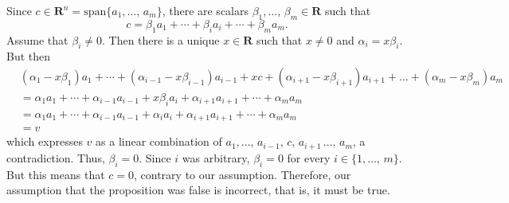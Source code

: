 \documentclass[a4paper,11pt]{article}
\newcommand{\R}{\mathbf{R}}
\begin{document}
Since $c \in \R^n=\text{span}\{a_1,\dots,\,a_m\}$, there are scalars
$\beta_1,\dots,\,\beta_m \in \R$ such that
\[
  c = \beta_1a_1 + \cdots + \beta_ia_i + \cdots + \beta_ma_m.
\]
Assume that $\beta_i \neq 0$. Then there is a unique $x \in \R$ such that $x
\neq 0$ and $\alpha_i = x\beta_i$. But then
\begin{align*}
  &(\alpha_1-x\beta_1)a_1 + \cdots + (\alpha_{i-1}-x\beta_{i-1})a_{i-1} +
  xc + (\alpha_{i+1}-x\beta_{i+1})a_{i+1} + \dots + (\alpha_m-x\beta_m)a_m \\
  &= \alpha_1a_1 + \cdots + \alpha_{i-1}a_{i-1} + x\beta_ia_i +
    \alpha_{i+1}a_{i+1} + \cdots + \alpha_ma_m \\
  &= \alpha_1a_1 + \cdots + \alpha_{i-1}a_{i-1} + \alpha_ia_i +
    \alpha_{i+1}a_{i+1} + \cdots + \alpha_ma_m \\
  &= v
\end{align*}
which expresses $v$ as a linear combination of
$a_1,\dots,\,a_{i-1},\,c,\,a_{i+1}\,\dots,\,a_m$, a contradiction. Thus,
$\beta_i = 0$. Since $i$ was arbitrary, $\beta_i = 0$ for every $i \in
\{1,\dots,\,m\}$. But this means that $c=0$, contrary to our assumption.
Therefore, our assumption that the proposition was false is incorrect, that is,
it must be true.
\end{document}
